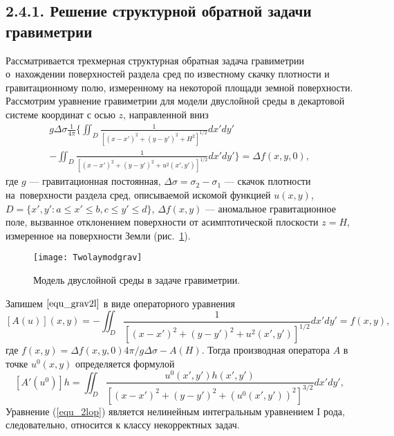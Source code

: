 \subsection*{2.4.1. Решение структурной обратной задачи гравиметрии} 

Рассматривается трехмерная структурная обратная задача гравиметрии о~нахождении поверхностей раздела сред по известному скачку плотности и гравитационному полю, измеренному на некоторой площади земной поверхности.
Рассмотрим уравнение гравиметрии для модели двуслойной среды в декартовой системе координат с осью $z$, направленной вниз 
\begin{equation}\label{equ_grav2l}
\begin{aligned}
g\Delta\sigma\frac{1}{4\pi} \bigg\{ \iint_{D} \frac{1}{[(x-x')^2+(y-y')^2+H^2]^{1/2}}dx'dy' \\
- 
\iint_{D} \frac{1}{[(x-x')^2+(y-y')^2+u^2(x',y')]^{1/2}}dx'dy'\bigg\}=\Delta f(x,y,0),
\end{aligned} 
\end{equation}
где $g$ --- гравитационная постоянная, $\Delta\sigma=\sigma_2-\sigma_1$ --- скачок плотности на~поверхности раздела сред, описываемой искомой функцией $u(x,y)$, $D=\{x',y':a \le x'\le b, c\le y' \le d\}$, $\Delta f(x,y)$ --- аномальное гравитационное поле, вызванное отклонением поверхности от асимптотической плоскости $z=H$, измеренное на поверхности Земли (рис.~\ref{fig:twolayergrav}). 
\begin{figure}[H]
	\centering
	\texttt{[image: Twolaymodgrav]}
	\caption{Модель двуслойной среды в задаче гравиметрии.}
	\label{fig:twolayergrav}
	\end{figure}
Запишем $\eqref{equ_grav2l}$ в виде операторного уравнения
\begin{equation}\label{equ_2lop}
	[A(u)](x,y)=-\iint_{D} \frac{1}{[(x-x')^2+(y-y')^2+u^2(x',y')]^{1/2}}dx'dy'=f(x,y),
\end{equation}
где $f(x,y)=\Delta f(x,y,0) 4\pi/g\Delta\sigma - A(H)$. Тогда производная оператора $A$ в точке $u^0(x,y)$ определяется формулой
$$ [A'(u^0)]h=\iint_{D} \frac{u^0(x',y')h(x',y')}{[(x-x')^2+(y-y')^2+(u^0(x',y'))^2]^{3/2}}dx'dy', $$
Уравнение (\ref{equ_2lop}) является нелинейным интегральным уравнением $\textrm{I}$ рода, следовательно, относится к классу некорректных задач.
	
